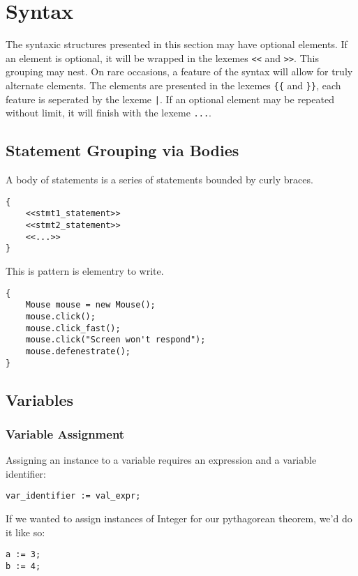 \section{Syntax}
The syntaxic structures presented in this section may have optional elements. If an element is optional, it will be wrapped in the lexemes \verb!<<! and \verb!>>!. This grouping may nest. On rare occasions, a feature of the syntax will allow for truly alternate elements. The elements are presented in the lexemes \verb!{{! and \verb!}}!, each feature is seperated by the lexeme \verb!|!. If an optional element may be repeated without limit, it will finish with the lexeme \verb!...!.
\subsection{Statement Grouping via Bodies}
A body of statements is a series of statements bounded by curly braces.

\begin{lstlisting}
{
	<<stmt1_statement>>
	<<stmt2_statement>>
	<<...>>
}
\end{lstlisting}

This is pattern is elementry to write.

\begin{lstlisting}[caption=Statement Grouping of a Typical Interface Simulator,backgroundcolor=\color{tintedorange}]
{
	Mouse mouse = new Mouse();
	mouse.click();
	mouse.click_fast();
	mouse.click("Screen won't respond");
	mouse.defenestrate();
}
\end{lstlisting}

\subsection{Variables}
\subsubsection{Variable Assignment}
Assigning an instance to a variable requires an expression and a variable identifier:

\begin{lstlisting}
var_identifier := val_expr;
\end{lstlisting}

If we wanted to assign instances of Integer for our pythagorean theorem, we'd do it like so:

\begin{lstlisting}[caption=Variable Assignment for the Pythagorean Theorem,backgroundcolor=\color{tintedorange}]
a := 3;
b := 4;
\end{lstlisting}

